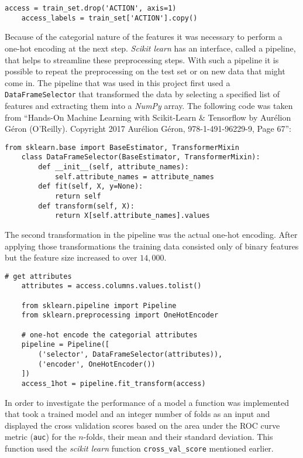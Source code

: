 \documentclass[11pt]{article}
\begin{document}
\begin{lstlisting}[frame=single]
    access = train_set.drop('ACTION', axis=1)
    access_labels = train_set['ACTION'].copy()
\end{lstlisting}
\noindent
Because of the categorial nature of the features it was necessary to
perform a one-hot encoding at the next step. {\it Scikit learn}
has an interface, called a pipeline, that helps to streamline
these preprocessing steps. With such a pipeline it is possible to 
repeat the preprocessing on the test set or on new data that might come in.
The pipeline that was used in this project first used a {\tt DataFrameSelector}
that transformed the data by selecting a specified list of features 
and extracting them into a {\it NumPy} array.
The following code was taken from ``Hands-On Machine Learning with Scikit-Learn \& 
Tensorflow by Aur\'elion G\'eron (O'Reilly). Copyright 2017 Aur\'elion G\'eron, 978-1-491-96229-9, Page 67'':
\begin{lstlisting}[frame=single]
    from sklearn.base import BaseEstimator, TransformerMixin
    class DataFrameSelector(BaseEstimator, TransformerMixin):
        def __init__(self, attribute_names):
            self.attribute_names = attribute_names
        def fit(self, X, y=None):
            return self
        def transform(self, X):
            return X[self.attribute_names].values
\end{lstlisting}
\noindent
The second transformation in the pipeline was the actual one-hot encoding.
After applying those transformations the training data consisted only of
binary features but the feature size increased to over $14,000$.
\begin{lstlisting}[frame=single]
    # get attributes
    attributes = access.columns.values.tolist()

    from sklearn.pipeline import Pipeline
    from sklearn.preprocessing import OneHotEncoder

    # one-hot encode the categorial attributes
    pipeline = Pipeline([
        ('selector', DataFrameSelector(attributes)),
        ('encoder', OneHotEncoder())
    ])
    access_1hot = pipeline.fit_transform(access)
\end{lstlisting}
\noindent
In order to investigate the performance of a model a 
function was implemented that took a trained model and an integer
number of folds as an input and displayed the cross validation scores based
on the area under the ROC curve metric ({\tt auc}) for the $n$-folds,
their mean and their standard deviation. This function used the
{\it scikit learn} function {\tt cross\_val\_score} mentioned earlier.
\end{document}
